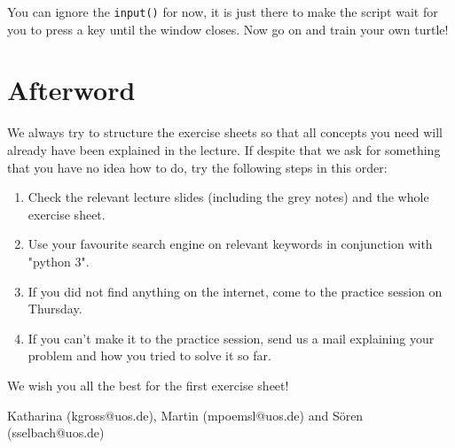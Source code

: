 \noindent You can ignore the \texttt{input()} for now, it is just there to make the script wait for you to press a key until the window closes. Now go on and train your own turtle!

\newpage

\section*{Afterword}

\noindent We always try to structure the exercise sheets so that all concepts you need will already have been explained in the lecture. If despite that we ask for something that you have no idea how to do, try the following steps in this order:

\begin{enumerate}

\item Check the relevant lecture slides (including the grey notes) and the whole exercise sheet.
\item Use your favourite search engine on relevant keywords in conjunction with "python 3".
\item If you did not find anything on the internet, come to the practice session on Thursday.
\item If you can't make it to the practice session, send us a mail explaining your problem and how you tried to solve it so far.

\end{enumerate}

\vspace{1em}

\noindent We wish you all the best for the first exercise sheet!

\vspace{1em}

\noindent Katharina (kgross@uos.de), Martin (mpoemsl@uos.de) and Sören (sselbach@uos.de)




